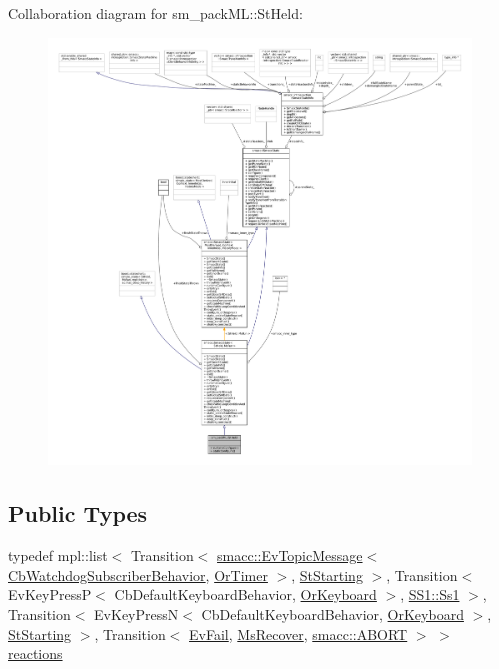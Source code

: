 Collaboration diagram for sm\+\_\+pack\+ML\+:\+:St\+Held\+:
\nopagebreak
\begin{figure}[H]
\begin{center}
\leavevmode
\includegraphics[width=350pt]{structsm__packML_1_1StHeld__coll__graph}
\end{center}
\end{figure}
\subsection*{Public Types}
\begin{DoxyCompactItemize}
\item 
typedef mpl\+::list$<$ Transition$<$ \hyperlink{structsmacc_1_1default__events_1_1EvTopicMessage}{smacc\+::\+Ev\+Topic\+Message}$<$ \hyperlink{classsm__packML_1_1cl__subscriber_1_1CbWatchdogSubscriberBehavior}{Cb\+Watchdog\+Subscriber\+Behavior}, \hyperlink{classsm__packML_1_1OrTimer}{Or\+Timer} $>$, \hyperlink{structsm__packML_1_1StStarting}{St\+Starting} $>$, Transition$<$ Ev\+Key\+PressP$<$ Cb\+Default\+Keyboard\+Behavior, \hyperlink{classsm__packML_1_1OrKeyboard}{Or\+Keyboard} $>$, \hyperlink{structsm__packML_1_1SS1_1_1Ss1}{S\+S1\+::\+Ss1} $>$, Transition$<$ Ev\+Key\+PressN$<$ Cb\+Default\+Keyboard\+Behavior, \hyperlink{classsm__packML_1_1OrKeyboard}{Or\+Keyboard} $>$, \hyperlink{structsm__packML_1_1StStarting}{St\+Starting} $>$, Transition$<$ \hyperlink{structsm__packML_1_1EvFail}{Ev\+Fail}, \hyperlink{classsm__packML_1_1MsRecover}{Ms\+Recover}, \hyperlink{structsmacc_1_1default__transition__tags_1_1ABORT}{smacc\+::\+A\+B\+O\+RT} $>$ $>$ \hyperlink{structsm__packML_1_1StHeld_ae1ea508a2506f48a1c50f895ade16aad}{reactions}
\end{DoxyCompactItemize}
